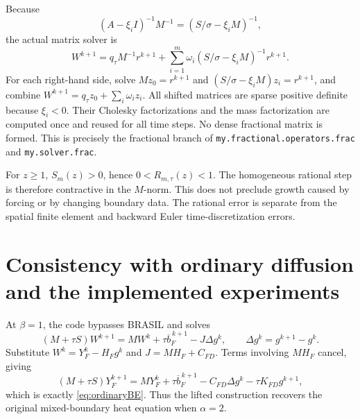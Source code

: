 \documentclass[11pt,a4paper]{article}
\begin{document}
Because
\[
 (A-\xi_iI)^{-1}M^{-1}=(S/\sigma-\xi_iM)^{-1},
\]
the actual matrix solver is
\begin{equation}\label{eq:actualsolver}
 \boxed{
 W^{k+1}=q_\tau M^{-1}r^{k+1}
           +\sum_{i=1}^m\omega_i
               (S/\sigma-\xi_iM)^{-1}r^{k+1}.}
\end{equation}
For each right-hand side, solve $Mz_0=r^{k+1}$ and
$(S/\sigma-\xi_iM)z_i=r^{k+1}$, and combine
$W^{k+1}=q_\tau z_0+\sum_i\omega_i z_i$.
All shifted matrices are sparse positive definite because $\xi_i<0$.
Their Cholesky factorizations and the mass factorization are computed
once and reused for all time steps. No dense fractional matrix is formed.
This is precisely the fractional branch of
\texttt{my.fractional.operators.frac} and \texttt{my.solver.frac}.

For $z\geq1$, $S_m(z)>0$, hence $0<R_{m,\tau}(z)<1$.
The homogeneous rational step is therefore contractive in the
$M$-norm. This does not preclude growth caused by forcing or by
changing boundary data. The rational error is separate from the spatial
finite element and backward Euler time-discretization errors.

\section{Consistency with ordinary diffusion and the implemented experiments}
At $\beta=1$, the code bypasses BRASIL and solves
\[
 (M+\tau S)W^{k+1}=MW^k+\tau\overline b_F^{\,k+1}-J\Delta g^k,
 \qquad \Delta g^k=g^{k+1}-g^k.
\]
Substitute $W^k=Y_F^k-H_Fg^k$ and
$J=MH_F+C_{FD}$. Terms involving $MH_F$ cancel, giving
\[
 (M+\tau S)Y_F^{k+1}
 =MY_F^k+\tau\overline b_F^{\,k+1}
       -C_{FD}\Delta g^k-\tau K_{FD}g^{k+1},
\]
which is exactly \eqref{eq:ordinaryBE}. Thus the lifted construction
recovers the original mixed-boundary heat equation when $\alpha=2$.
\end{document}

